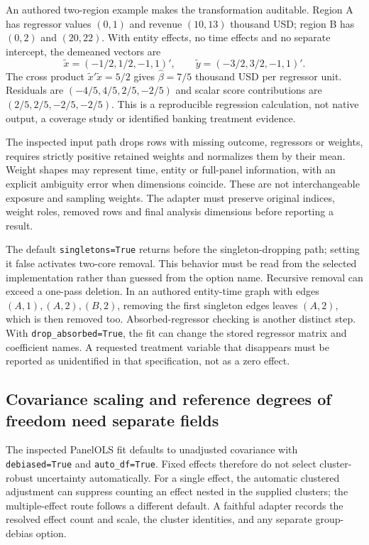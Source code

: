 An authored two-region example makes the transformation auditable. Region A
has regressor values $(0,1)$ and revenue $(10,13)$ thousand USD; region B has
$(0,2)$ and $(20,22)$. With entity effects, no time effects and no separate
intercept, the demeaned vectors are
\[
 \widetilde x=(-1/2,1/2,-1,1)',\qquad
 \widetilde y=(-3/2,3/2,-1,1)'.
\]
The cross product $\widetilde x'\widetilde x=5/2$ gives
$\widehat\beta=7/5$ thousand USD per regressor unit. Residuals are
$(-4/5,4/5,2/5,-2/5)$ and scalar score contributions are
$(2/5,2/5,-2/5,-2/5)$. This is a reproducible regression calculation, not
native output, a coverage study or identified banking treatment evidence.
\citep{exec24_lmpanel_reference}

The inspected input path drops rows with missing outcome, regressors or
weights, requires strictly positive retained weights and normalizes them
by their mean. Weight shapes may represent time, entity or full-panel
information, with an explicit ambiguity error when dimensions coincide.
These are not interchangeable exposure and sampling weights. The adapter
must preserve original indices, weight roles, removed rows and final
analysis dimensions before reporting a result.
\citep{exec24_lmpanel_source}

The default \texttt{singletons=True} returns before the singleton-dropping
path; setting it false activates two-core removal. This behavior must be
read from the selected implementation rather than guessed from the option
name. Recursive removal can exceed a one-pass deletion. In an authored
entity-time graph with edges $(A,1),(A,2),(B,2)$, removing the first singleton
edges leaves $(A,2)$, which is then removed too. Absorbed-regressor checking
is another distinct step. With \texttt{drop\_absorbed=True}, the fit can
change the stored regressor matrix and coefficient names. A requested
treatment variable that disappears must be reported as unidentified in
that specification, not as a zero effect.
\citep{exec24_lmpanel_source,exec24_lmpanel_reference}

\subsection{Covariance scaling and reference degrees of freedom need separate fields}
The inspected PanelOLS fit defaults to unadjusted covariance with
\texttt{debiased=True} and \texttt{auto\_df=True}. Fixed effects therefore
do not select cluster-robust uncertainty automatically. For a single effect,
the automatic clustered adjustment can suppress counting an effect nested
in the supplied clusters; the multiple-effect route follows a different
default. A faithful adapter records the resolved effect count and scale,
the cluster identities, and any separate group-debias option.
\citep{exec24_lmpanel_source}

